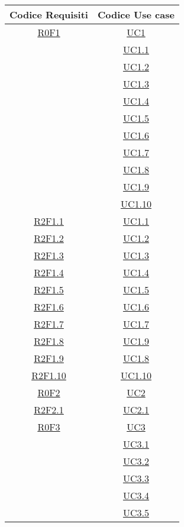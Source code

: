 \normalsize
\begin{longtable}{|c|c|}
\hline
\textbf{Codice Requisiti} & \textbf{Codice Use case} \\
\hline
\endhead
\hyperlink{R0F1}{R0F1} & \hyperlink{UC1}{UC1}\\
& \hyperlink{UC1.1}{UC1.1}\\
& \hyperlink{UC1.2}{UC1.2}\\
& \hyperlink{UC1.3}{UC1.3}\\
& \hyperlink{UC1.4}{UC1.4}\\
& \hyperlink{UC1.5}{UC1.5}\\
& \hyperlink{UC1.6}{UC1.6}\\
& \hyperlink{UC1.7}{UC1.7}\\
& \hyperlink{UC1.8}{UC1.8}\\
& \hyperlink{UC1.9}{UC1.9}\\
& \hyperlink{UC1.10}{UC1.10}\\
\hline
\hyperlink{R2F1.1}{R2F1.1} & \hyperlink{UC1.1}{UC1.1}\\
\hline
\hyperlink{R2F1.2}{R2F1.2} & \hyperlink{UC1.2}{UC1.2}\\
\hline
\hyperlink{R2F1.3}{R2F1.3} & \hyperlink{UC1.3}{UC1.3}\\
\hline
\hyperlink{R2F1.4}{R2F1.4} & \hyperlink{UC1.4}{UC1.4}\\
\hline
\hyperlink{R2F1.5}{R2F1.5} & \hyperlink{UC1.5}{UC1.5}\\
\hline
\hyperlink{R2F1.6}{R2F1.6} & \hyperlink{UC1.6}{UC1.6}\\
\hline
\hyperlink{R2F1.7}{R2F1.7} & \hyperlink{UC1.7}{UC1.7}\\
\hline
\hyperlink{R2F1.8}{R2F1.8} & \hyperlink{UC1.9}{UC1.9}\\
\hline
\hyperlink{R2F1.9}{R2F1.9} & \hyperlink{UC1.8}{UC1.8}\\
\hline
\hyperlink{R2F1.10}{R2F1.10} & \hyperlink{UC1.10}{UC1.10}\\
\hline
\hyperlink{R0F2}{R0F2} & \hyperlink{UC2}{UC2}\\
\hline
\hyperlink{R2F2.1}{R2F2.1} & \hyperlink{UC2.1}{UC2.1}\\
\hline
\hyperlink{R0F3}{R0F3} & \hyperlink{UC3}{UC3}\\
& \hyperlink{UC3.1}{UC3.1}\\
& \hyperlink{UC3.2}{UC3.2}\\
& \hyperlink{UC3.3}{UC3.3}\\
& \hyperlink{UC3.4}{UC3.4}\\
& \hyperlink{UC3.5}{UC3.5}\\

\end{longtable}
